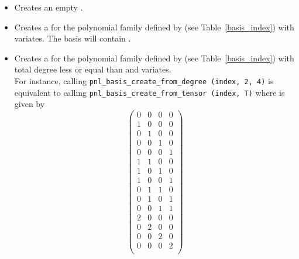 \begin{itemize}
  \item {}
    \sshortdescribe Creates an empty .

  \item {}
    \sshortdescribe Creates a  for the polynomial family
    defined by  (see Table~\ref{basis_index}) with 
    variates. The basis will contain . 

  \item {}
    \sshortdescribe Creates a  for the polynomial family
    defined by  (see Table~\ref{basis_index}) with total degree less
    or equal than  and  variates.\\
    For instance, calling \verb!pnl_basis_create_from_degree (index, 2, 4)! is
    equivalent to calling \verb!pnl_basis_create_from_tensor (index, T)! where
     is given by
    \[ \left(
    \begin{array}{cccc}
      0 & 0 & 0 & 0\\
      1 & 0 & 0 & 0\\
      0 & 1 & 0 & 0\\
      0 & 0 & 1 & 0\\
      0 & 0 & 0 & 1\\
      1 & 1 & 0 & 0\\
      1 & 0 & 1 & 0\\
      1 & 0 & 0 & 1\\
      0 & 1 & 1 & 0\\
      0 & 1 & 0 & 1\\
      0 & 0 & 1 & 1\\
      2 & 0 & 0 & 0\\
      0 & 2 & 0 & 0\\
      0 & 0 & 2 & 0\\
      0 & 0 & 0 & 2\\
    \end{array}
    \right) \]



\end{itemize}
